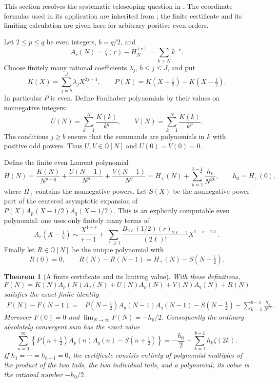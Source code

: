 \documentclass[11pt,letterpaper]{article}
\numberwithin{equation}{section}
\theoremstyle{plain}
\newtheorem{theorem}{Theorem}[section]
\theoremstyle{definition}
\theoremstyle{remark}
\begin{document}
This section resolves the systematic telescoping question in \cite{DPL}.
The coordinate formulas used in its application are inherited from
\cite{DPL,BTD}; the finite certificate and its limiting calculation
are given here for arbitrary positive even orders.

Let $2\le p\le q$ be even integers, $b=q/2$, and
\[
 A_r(N)=\zeta(r)-H_N^{(r)}=\sum_{k>N}k^{-r}.
\]
Choose finitely many rational coefficients $\lambda_j$, $b\le j\le J$,
and put
\[
 K(X)=\sum_{j=b}^J\lambda_jX^{2j+1},\qquad
 P(X)=K(X+\tfrac12)-K(X-\tfrac12).
\]
In particular $P$ is even. Define Faulhaber polynomials by their values
on nonnegative integers:
\[
 U(N)=\sum_{k=1}^N\frac{K(k)}{k^q},\qquad
 V(N)=\sum_{k=1}^N\frac{K(k)}{k^p}.
\]
The conditions $j\ge b$ ensure that the summands are polynomials in
$k$ with positive odd powers. Thus $U,V\in\mathbb Q[N]$ and
$U(0)=V(0)=0$.

Define the finite even Laurent polynomial
\begin{equation}\label{tel:H}
 H(N)=\frac{K(N)}{N^{p+q}}+
       \frac{U(N-1)}{N^p}+\frac{V(N-1)}{N^q}
      =H_+(N)+\sum_{k=1}^{b-1}\frac{h_k}{N^{2k}},
 \qquad h_0=H_+(0),
\end{equation}
where $H_+$ contains the nonnegative powers.
Let $S(X)$ be the nonnegative-power part of the centered asymptotic
expansion of $P(X)A_p(X-1/2)A_q(X-1/2)$.
This is an explicitly computable even polynomial: one uses only finitely
many terms of
\begin{equation}\label{tel:centered}
 A_r(X-\tfrac12)\sim\frac{X^{1-r}}{r-1}
 +\sum_{\ell\ge1}\frac{B_{2\ell}(1/2)(r)_{2\ell-1}}{(2\ell)!}
      X^{1-r-2\ell}.
\end{equation}
Finally let $R\in\mathbb Q[N]$ be the unique polynomial with
\[
 R(0)=0,\qquad R(N)-R(N-1)=H_+(N)-S(N-\tfrac12).
\]

\begin{theorem}[A finite certificate and its limiting value]
\label{tel:main}
With these definitions,
\begin{equation}\label{tel:F}
 F(N)=K(N)A_p(N)A_q(N)+U(N)A_p(N)+V(N)A_q(N)+R(N)
\end{equation}
satisfies the exact finite identity
\begin{align}\label{tel:finite}
 F(N)-F(N-1)={}&P(N-\tfrac12)A_p(N-1)A_q(N-1)
   -S(N-\tfrac12)-\sum_{k=1}^{b-1}\frac{h_k}{N^{2k}}.
\end{align}
Moreover $F(0)=0$ and $\lim_{N\to\infty}F(N)=-h_0/2$.
Consequently the ordinary absolutely convergent sum has the exact value
\begin{equation}\label{tel:evaluation}
 \boxed{\displaystyle
 \sum_{n=0}^\infty
 \left\{P(n+\tfrac12)A_p(n)A_q(n)-S(n+\tfrac12)\right\}
 =-\frac{h_0}{2}+\sum_{k=1}^{b-1}h_k\zeta(2k).}
\end{equation}
If $h_1=\cdots=h_{b-1}=0$, the certificate consists entirely of
polynomial multiples of the product of the two tails, the two individual
tails, and a polynomial; its value is the rational number $-h_0/2$.
\end{theorem}
\end{document}
